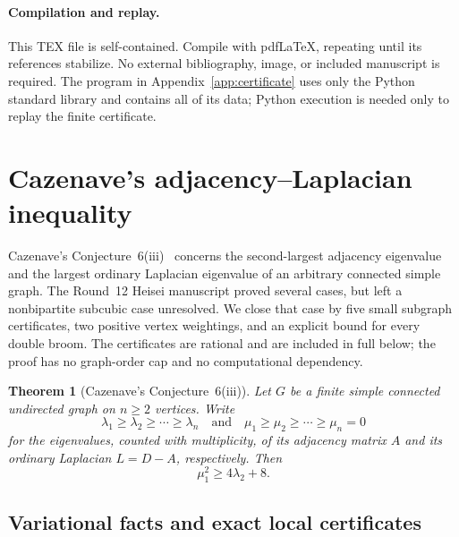 \documentclass[11pt,a4paper]{article}
\numberwithin{equation}{section}
\newtheorem{theorem}{Theorem}[section]
\theoremstyle{remark}
\begin{document}
\paragraph{Compilation and replay.}
This TEX file is self-contained. Compile with pdfLaTeX, repeating
until its references stabilize. No external bibliography, image, or
included manuscript is required. The program in Appendix~\ref{app:certificate}
uses only the Python standard library and contains all of its data;
Python execution is needed only to replay the finite certificate.
\clearpage
\section{Cazenave's adjacency--Laplacian inequality}
\label{caz:section}

Cazenave's Conjecture~6(iii)~\cite{Cazenave2026} concerns the
second-largest adjacency eigenvalue and the largest ordinary
Laplacian eigenvalue of an arbitrary connected simple graph. The
Round~12 Heisei manuscript proved several cases, but left a
nonbipartite subcubic case unresolved. We close that case by five
small subgraph certificates, two positive vertex weightings, and an
explicit bound for every double broom. The certificates are rational
and are included in full below; the proof has no graph-order cap and
no computational dependency.

\begin{theorem}[Cazenave's Conjecture~6(iii)]
\label{caz:main}
Let $G$ be a finite simple connected undirected graph on $n\ge2$
vertices. Write
\[
 \lambda_1\ge\lambda_2\ge\cdots\ge\lambda_n
 \quad\text{and}\quad
 \mu_1\ge\mu_2\ge\cdots\ge\mu_n=0
\]
for the eigenvalues, counted with multiplicity, of its adjacency
matrix $A$ and its ordinary Laplacian $L=D-A$, respectively. Then
\begin{equation}
 \mu_1^2\ge4\lambda_2+8.
 \label{caz:target}
\end{equation}
\end{theorem}

\subsection{Variational facts and exact local certificates}
\end{document}
